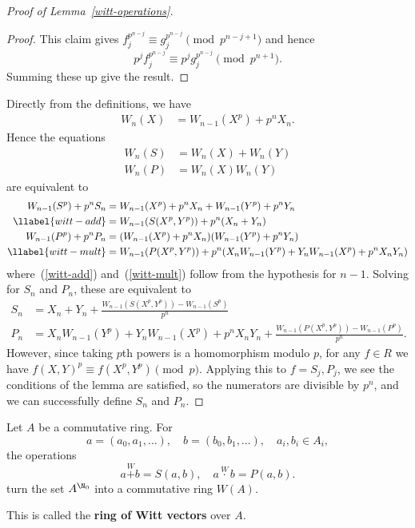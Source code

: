 \begin{proof}[Proof of Lemma~\ref{witt-operations}]
\begin{proof}
This claim gives $f_j^{p^{n-j}}\equiv g_j^{p^{n-j}}\pmod{p^{n-j+1}}$ and hence
\[
p^jf_j^{p^{n-j}}\equiv p^jg_j^{p^{n-j}}\pmod{p^{n+1}}.
\]
Summing these up give the result.
\end{proof}
Directly from the definitions, we have
\begin{align*}
W_n(X)&=W_{n-1}(X^p)+p^nX_n.
\end{align*}
Hence the equations
\begin{align*}
W_n(S)&=W_n(X)+W_n(Y)\\
W_n(P)&=W_n(X)W_n(Y)
\end{align*}
are equivalent to
\begin{align}
\nonumber
W_{n-1}(S^p)+p^nS_n&=W_{n-1}(X^p) +p^nX_n +W_{n-1}(Y^p)+p^nY_n\\
\llabel{witt-add}
&=W_{n-1}(S(X^p,Y^p))+p^n(X_n+Y_n)\\
\nonumber
W_{n-1}(P^p)+p^nP_n&=(W_{n-1}(X^p) +p^nX_n)(W_{n-1}(Y^p)+p^nY_n)\\
\llabel{witt-mult}
&=W_{n-1}(P(X^p,Y^p))+p^n(X_nW_{n-1}(Y^p)+Y_nW_{n-1}(X^p)+p^nX_nY_n)
\end{align}
where~(\ref{witt-add}) and~(\ref{witt-mult}) follow from the hypothesis for $n-1$. 
Solving for $S_n$ and $P_n$, these are equivalent to
\begin{align*}
S_n&=X_n+Y_n+\frac{W_{n-1}(S(X^p,Y^p))-W_{n-1}(S^p)}{p^n}\\
P_n&=X_nW_{n-1}(Y^p)+Y_nW_{n-1}(X^p)+p^nX_nY_n+\frac{W_{n-1}(P(X^p,Y^p))-W_{n-1}(P^p)}{p^n}.
\end{align*}
However, since taking $p$th powers is a homomorphism modulo $p$, for any $f\in R$ we have $f(X,Y)^p\equiv f(X^p,Y^p)\pmod p$.
Applying this to $f=S_j,P_j$, we see the conditions of the lemma are satisfied, so the numerators are divisible by $p^n$, and we can successfully define $S_n$ and $P_n$.
\end{proof}
\begin{thm}
Let $A$ be a commutative ring. For 
\[
a=(a_0,a_1,\ldots),\quad b=(b_0,b_1,\ldots),\quad a_i,b_i\in A_i,
\]
the operations
\[
a\stackrel{W}{+} b=S(a,b),\quad a\stackrel{W}{\cdot} b=P(a,b).
\]
turn the set $A^{\N_0}$ into a commutative ring $W(A)$.
\end{thm}
This is called the \textbf{ring of Witt vectors} over $A$.
